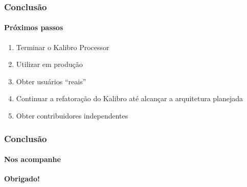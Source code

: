 \documentclass{beamer}
\begin{document}
\begin{frame}
  \frametitle{Conclusão}
  \framesubtitle{Próximos passos}

  \begin{enumerate}
    \item Terminar o Kalibro Processor
    \item Utilizar em produção
    \item Obter usuários ``reais''
    \item Continuar a refatoração do Kalibro até alcançar a arquitetura planejada
    \item Obter contribuidores independentes
  \end{enumerate}
\end{frame}

\begin{frame}
  \frametitle{Conclusão}
  \framesubtitle{Nos acompanhe}

  \LARGE{\textbf{Obrigado!}}
\end{frame}
\end{document}
